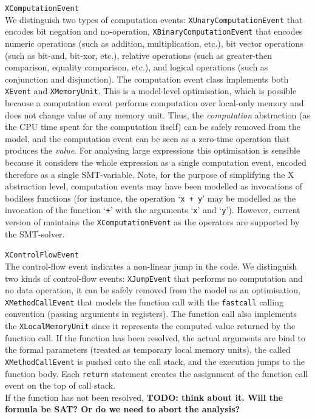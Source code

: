 \begin{outline}
  \1 \texttt{XComputationEvent} \\
    We distinguish two types of computation events:
      \2 \texttt{XUnaryComputationEvent} that encodes bit negation and no-operation, 
      \2 \texttt{XBinaryComputationEvent} that encodes numeric operations (such as addition, multiplication, etc.), bit vector operations (such as bit-and, bit-xor, etc.), relative operations (such as greater-then comparison, equality comparison, etc.), and logical operations (such as conjunction and disjunction). 
    \newline
    The computation event class implements both \texttt{XEvent} and \texttt{XMemoryUnit}.
    This is a model-level optimisation, which is possible because a computation event performs computation over local-only memory and does not change value of any memory unit.
    Thus, the \textit{computation} abstraction (as the CPU time spent for the computation itself) can be safely removed from the model, and the computation event can be seen as a zero-time operation that produces the \textit{value}.
    For analysing large expressions this optimisation is sensible because it considers the whole expression as a single computation event, encoded therefore as a single SMT-variable.
    \newline
    Note, for the purpose of simplifying the X abstraction level, computation events may have been modelled as invocations of bodiless functions (for instance, the operation `\lstinline{x + y}' may be modelled as the invocation of the function `\lstinline{+}' with the arguments `\lstinline{x}' and `\lstinline{y}').
    However, current version of \porthos[2] maintains the \texttt{XComputationEvent} as the operators are supported by the SMT-solver.
    
  \1 \texttt{XControlFlowEvent} \\
    The control-flow event indicates a non-linear jump in the code. We distinguish two kinds of control-flow events: 
      \2 \texttt{XJumpEvent} that performs no computation and no data operation, it can be safely removed from the model as an optimisation,
      \2 \texttt{XMethodCallEvent} that models the function call with the \texttt{fastcall} calling convention (passing arguments in registers).
      The function call also implements the \texttt{XLocalMemoryUnit} since it represents the computed value returned by the function call.
      If the function has been resolved, the actual arguments are bind to the formal parameters (treated as temporary local memory units), the called \texttt{XMethodCallEvent} is pushed onto the call stack, and the execution jumps to the function body.
      Each \texttt{return} statement creates the assignment of the function call event on the top of call stack.
      \\
      If the function has not been resolved, \textbf{TODO: think about it. Will the formula be SAT? Or do we need to abort the analysis?}


\end{outline}
